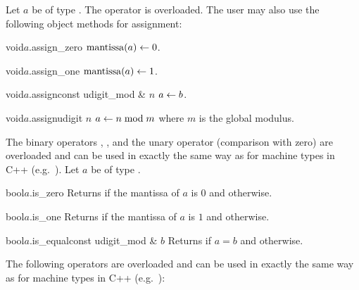 
\ASGN

Let $a$ be of type .  The operator \code{=} is overloaded.  The user may also use
the following object methods for assignment:

\begin{fcode}{void}{$a$.assign_zero}{}
  $\operatorname{mantissa}(a) \leftarrow 0$.
\end{fcode}

\begin{fcode}{void}{$a$.assign_one}{}
  $\operatorname{mantissa}(a) \leftarrow 1$.
\end{fcode}

\begin{fcode}{void}{$a$.assign}{const udigit_mod & $n$}
  $a \leftarrow b$.
\end{fcode}

\begin{fcode}{void}{$a$.assign}{udigit $n$}
  $a \leftarrow n \bmod m$ where $m$ is the global modulus.
\end{fcode}



\COMP

The binary operators \code{==}, \code{!=}, and the unary operator \code{!} (comparison with
zero) are overloaded and can be used in exactly the same way as for machine types in C++
(e.g.~).  Let $a$ be of type .

\begin{cfcode}{bool}{$a$.is_zero}{}
  Returns \TRUE if the mantissa of $a$ is $0$ and \FALSE otherwise.
\end{cfcode}

\begin{cfcode}{bool}{$a$.is_one}{}
  Returns \TRUE if the mantissa of $a$ is $1$ and \FALSE otherwise.
\end{cfcode}

\begin{cfcode}{bool}{$a$.is_equal}{const udigit_mod & $b$}
  Returns \TRUE if $a = b$ and \FALSE otherwise.
\end{cfcode}



\ARTH

The following operators are overloaded and can be used in exactly the same way as for machine
types in C++ (e.g.~):

